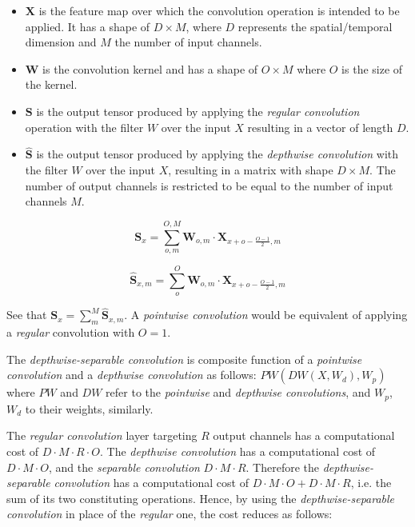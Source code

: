 \begin{itemize}
	\item $\mathbf{X}$ is the feature map over which the convolution operation is intended to be applied. It has a shape of $D \times M$, where $D$ represents the spatial/temporal dimension and $M$ the number of input channels.
	\item $\mathbf{W}$ is the convolution kernel and has a shape of $O \times M$ where $O$ is the size of the kernel.
	\item $\mathbf{S}$ is the output tensor produced by applying the \textit{regular convolution} operation with the filter $W$ over the input $X$ resulting in a vector of length $D$.
	\item $\hat{\mathbf{S}}$ is the output tensor produced by applying the \textit{depthwise convolution} with the filter $W$ over the input $X$, resulting in a matrix with shape $D \times M$. The number of output channels is restricted to be equal to the number of input channels $M$.
\end{itemize}


\begin{equation}
	\mathbf{S}_{x} = \sum_{o, m}^{O,M} \mathbf{W}_{o, m} \cdot \mathbf{X}_{x+o-\frac{O-1}{2}, m}
	\label{eq:reg_conv}
\end{equation}

\begin{equation}
	\hat{\mathbf{S}}_{x, m} = \sum_{o}^{O} \mathbf{W}_{o, m} \cdot \mathbf{X}_{x+o-\frac{O-1}{2}, m}
	\label{eq:dw_conv}
\end{equation}

See that $\mathbf{S}_{x} =  \sum_{m}^{M} \hat{\mathbf{S}}_{x, m}$. A \textit{pointwise convolution} would be equivalent of applying a \textit{regular} convolution with $O=1$.

The \textit{depthwise-separable convolution} is composite function of a \textit{pointwise convolution} and a \textit{depthwise convolution} as follows: $PW(DW(X,W_{d}),W_{p})$ where $PW$ and $DW$ refer to the \textit{pointwise} and \textit{depthwise convolutions}, and $W_{p}$, $W_{d}$ to their weights, similarly.

The \textit{regular convolution} layer targeting $R$ output channels has a computational cost of $D \cdot M \cdot R \cdot O$. The \textit{depthwise convolution} has a computational cost of $D \cdot M \cdot O$,  and the \textit{separable convolution} $D \cdot M \cdot R$. Therefore the \textit{depthwise-separable convolution} has a computational cost  of $D \cdot M  \cdot O + D \cdot M \cdot R$, i.e. the sum of its two constituting operations. Hence, by using the \textit{depthwise-separable convolution} in place of the \textit{regular} one, the cost reduces as follows:

